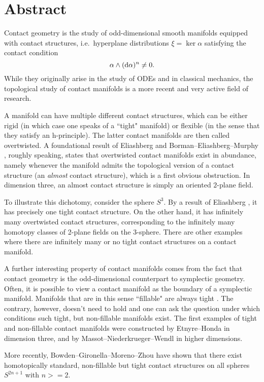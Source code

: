 \section*{Abstract}
Contact geometry is the study of odd-dimensional smooth manifolds equipped with contact structures, i.e.\ hyperplane distributions $\xi = \ker \alpha$ satisfying the contact condition
\[
    \alpha \wedge (\mathrm{d} \alpha)^n \neq 0.
\]
While they originally arise in the study of ODEs and in classical mechanics, the topological study of contact manifolds is a more recent and very active field of research.

A manifold can have multiple different contact structures, which can be either rigid (in which case one speaks of a ``tight" manifold) or flexible (in the sense that they satisfy an h-principle). The latter contact manifolds are then called overtwisted. A foundational result of Eliashberg \cite{Eliashberg89} and Borman--Eliashberg--Murphy \cite{BEM15}, roughly speaking, states that overtwisted contact manifolds exist in abundance, namely whenever the manifold admits the topological version of a contact structure (an \emph{almost} contact structure), which is a first obvious obstruction. In dimension three, an almost contact structure is simply an oriented $2$-plane field. 


To illustrate this dichotomy, consider the sphere $S^3$. By a result of Eliashberg \cite{Eliashberg92}, it has precisely one tight contact structure. On the other hand, it has infinitely many overtwisted contact structures, corresponding to the infinitely many homotopy classes of 2-plane fields on the 3-sphere. There are other examples where there are infinitely many or no tight contact structures on a contact manifold.

A further interesting property of contact manifolds comes from the fact that contact geometry is the odd-dimensional counterpart to symplectic geometry. Often, it is possible to view a contact manifold as the boundary of a symplectic manifold. Manifolds that are in this sense ``fillable" are always tight \cite{Gromov85,Eliashberg91}. The contrary, however, doesn't need to hold and one can ask the question under which conditions such tight, but non-fillable manifolds exist. The first examples of tight and non-fillable contact manifolds were constructed by Etnyre--Honda \cite{EH02} in dimension three, and by Massot--Niederkrueger--Wendl \cite{MNW13} in higher dimensions.


More recently, Bowden--Gironella--Moreno--Zhou \cite{BGMZ22} have shown that there exist homotopically standard, non-fillable but tight contact structures on all spheres $S^{2n+1}$ with $n >= 2$. 

